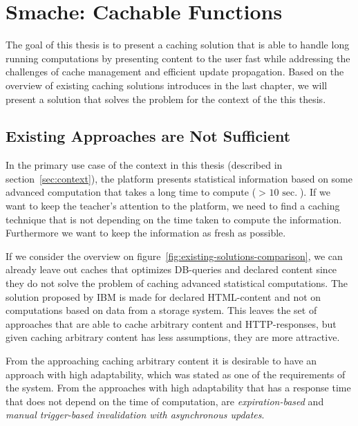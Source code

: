 \chapter{Smache: Cachable Functions}
\label{chapter:smache-cachable-functions}

The goal of this thesis is to present a caching solution that is able to handle long running computations by presenting content to the user fast while addressing the challenges of cache management and efficient update propagation. Based on the overview of existing caching solutions introduces in the last chapter, we will present a solution that solves the problem for the context of the this thesis.



\section{Existing Approaches are Not Sufficient}
\label{sec:existing-approaches-are-not-sufficient}



In the primary use case of the context in this thesis (described in section~\ref{sec:context}), the platform presents statistical information based on some advanced computation that takes a long time to compute ($>\text{ 10 sec.}$). If we want to keep the teacher's attention to the platform, we need to find a caching technique that is not depending on the time taken to compute the information. Furthermore we want to keep the information as fresh as possible.

If we consider the overview on figure~\ref{fig:existing-solutions-comparison}, we can already leave out caches that optimizes DB-queries and declared content since they do not solve the problem of caching advanced statistical computations. The solution proposed by IBM is made for declared HTML-content and not on computations based on data from a storage system. This leaves the set of approaches that are able to cache arbitrary content and HTTP-responses, but given caching arbitrary content has less assumptions, they are more attractive.

From the approaching caching arbitrary content it is desirable to have an approach with high adaptability, which was stated as one of the requirements of the system. From the approaches with high adaptability that has a response time that does not depend on the time of computation, are \emph{expiration-based} and \emph{manual trigger-based invalidation with asynchronous updates}.

